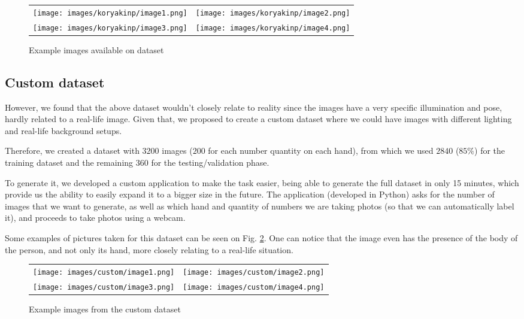 \documentclass[conference]{IEEEtran}
\begin{document}
\begin{figure}
\begin{tabular}{cc}
{\texttt{[image: images/koryakinp/image1.png]}} &
{\texttt{[image: images/koryakinp/image2.png]}} \\
{\texttt{[image: images/koryakinp/image3.png]}} &
{\texttt{[image: images/koryakinp/image4.png]}}
\end{tabular}
\caption{Example images available on \cite{b7} dataset}
\label{koryakinp_fingers}
\end{figure}

\subsection{Custom dataset}
However, we found that the above dataset wouldn't closely relate to reality since the images have a very specific illumination and pose, hardly related to a real-life image. Given that, we proposed to create a custom dataset where we could have images with different lighting and real-life background setups.

Therefore, we created a dataset with $3200$ images ($200$ for each number quantity on each hand), from which we used $2840$ ($85\%$) for the training dataset and the remaining $360$ for the testing/validation phase.

To generate it, we developed a custom application to make the task easier, being able to generate the full dataset in only 15 minutes, which provide us the ability to easily expand it to a bigger size in the future. The application (developed in Python) asks for the number of images that we want to generate, as well as which hand and quantity of numbers we are taking photos (so that we can automatically label it), and proceeds to take photos using a webcam.

Some examples of pictures taken for this dataset can be seen on Fig. \ref{custom_fingers}. One can notice that the image even has the presence of the body of the person, and not only its hand, more closely relating to a real-life situation. 

\begin{figure}
\begin{tabular}{cc}
{\texttt{[image: images/custom/image1.png]}} &
{\texttt{[image: images/custom/image2.png]}} \\
{\texttt{[image: images/custom/image3.png]}} &
{\texttt{[image: images/custom/image4.png]}}
\end{tabular}
\caption{Example images from the custom dataset}
\label{custom_fingers}
\end{figure}
\end{document}
